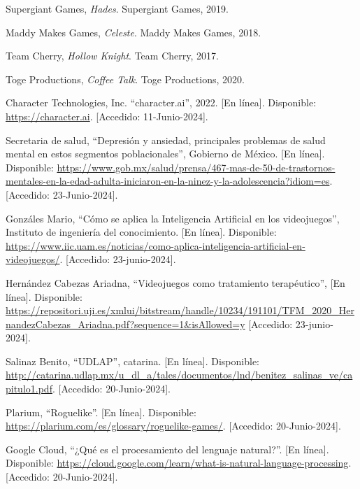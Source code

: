 \documentclass[12pt,twoside]{article}
\begin{document}
	\begin{thebibliography}{10}
	
	Supergiant Games, \textit{Hades}. Supergiant Games, 2019.
	
	Maddy Makes Games, \textit{Celeste}. Maddy Makes Games, 2018.
	
	Team Cherry, \textit{Hollow Knight}. Team Cherry, 2017.
	
	Toge Productions, \textit{Coffee Talk}. Toge Productions, 2020.
	
	Character Technologies, Inc. ``character.ai'', 2022. [En línea]. Disponible: \url{https://character.ai}. [Accedido: 11-Junio-2024].
	
	Secretaria de salud, ``Depresión y ansiedad, principales problemas de salud mental en estos segmentos poblacionales'', Gobierno de México. [En línea]. Disponible: \url{https://www.gob.mx/salud/prensa/467-mas-de-50-de-trastornos-mentales-en-la-edad-adulta-iniciaron-en-la-ninez-y-la-adolescencia?idiom=es}. [Accedido: 23-Junio-2024].
	
	Gonzáles Mario, ``Cómo se aplica la Inteligencia Artificial en los videojuegos'', Instituto de ingeniería del conocimiento. [En línea]. Disponible: \url{https://www.iic.uam.es/noticias/como-aplica-inteligencia-artificial-en-videojuegos/}. [Accedido: 23-junio-2024].
	
	Hernández Cabezas Ariadna, ``Videojuegos como tratamiento terapéutico'', [En línea]. Disponible: \url{https://repositori.uji.es/xmlui/bitstream/handle/10234/191101/TFM_2020_HernandezCabezas_Ariadna.pdf?sequence=1&isAllowed=y} [Accedido: 23-junio-2024].
	
	Salinaz Benito, ``UDLAP'', catarina. [En línea]. Disponible: \url{http://catarina.udlap.mx/u_dl_a/tales/documentos/lnd/benitez_salinas_ve/capitulo1.pdf}. [Accedido: 20-Junio-2024].
	
	Plarium, ``Roguelike''. [En línea]. Disponible: \url{https://plarium.com/es/glossary/roguelike-games/}. [Accedido: 20-Junio-2024].
	
	Google Cloud, ``¿Qué es el procesamiento del lenguaje natural?''. [En línea]. Disponible: \url{https://cloud.google.com/learn/what-is-natural-language-processing}. [Accedido: 20-Junio-2024].
	

\end{thebibliography}
\end{document}
